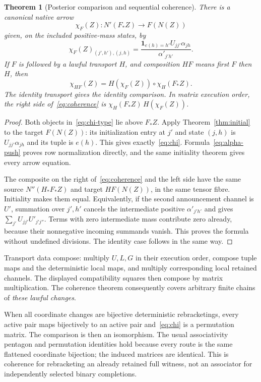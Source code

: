 \documentclass[11pt]{article}
\newtheorem{theorem}{Theorem}[section]
\theoremstyle{remark}
\begin{document}
\begin{theorem}[Posterior comparison and sequential coherence]\label{thm:coherence}
There is a canonical native arrow
\begin{equation}\label{eq:chi-type}
 \chi_F(Z):N'(F_*Z)\longrightarrow F(N(Z))
\end{equation}
given, on the included positive-mass states, by
\begin{equation}\label{eq:chi}
 \chi_F(Z)_{(j',h'),(j,h)}
 =\frac{\mathbf1_{e(h)=h'}U_{jj'}\alpha_{jh}}
 {\alpha'_{j'h'}}.
\end{equation}
If $F$ is followed by a lawful transport $H$, and composition $HF$ means first $F$ then $H$, then
\begin{equation}\label{eq:coherence}
 \chi_{HF}(Z)=H(\chi_F(Z))\circ\chi_H(F_*Z).
\end{equation}
The identity transport gives the identity comparison. In matrix execution order, the right side of~\eqref{eq:coherence} is $\chi_H(F_*Z)\,H(\chi_F(Z))$.
\end{theorem}
\begin{proof}
Both objects in~\eqref{eq:chi-type} lie above $F_*Z$. Apply Theorem~\ref{thm:initial} to the target $F(N(Z))$: its initialization entry at $j'$ and state $(j,h)$ is $U_{jj'}\alpha_{jh}$ and its tuple is $e(h)$. This gives exactly~\eqref{eq:chi}. Formula~\eqref{eq:alpha-push} proves row normalization directly, and the same initiality theorem gives every arrow equation.

The composite on the right of~\eqref{eq:coherence} and the left side have the same source $N''(H_*F_*Z)$ and target $HF(N(Z))$, in the same tensor fibre. Initiality makes them equal. Equivalently, if the second announcement channel is $U'$, summation over $j',h'$ cancels the intermediate positive $\alpha'_{j'h'}$ and gives $\sum_{j'}U_{jj'}U'_{j'j''}$. Terms with zero intermediate mass contribute zero already, because their nonnegative incoming summands vanish. This proves the formula without undefined divisions. The identity case follows in the same way.
\end{proof}

Transport data compose: multiply $U,L,G$ in their execution order, compose tuple maps and the deterministic local maps, and multiply corresponding local retained channels. The displayed compatibility squares then compose by matrix multiplication. The coherence theorem consequently covers arbitrary finite chains of \emph{these lawful changes}.

When all coordinate changes are bijective deterministic rebracketings, every active pair maps bijectively to an active pair and~\eqref{eq:chi} is a permutation matrix. The comparison is then an isomorphism. The usual associativity pentagon and permutation identities hold because every route is the same flattened coordinate bijection; the induced matrices are identical. This is coherence for rebracketing an already retained full witness, not an associator for independently selected binary completions.
\end{document}
